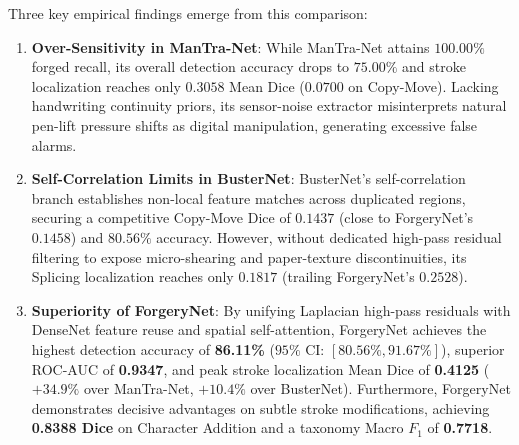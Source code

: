 \documentclass[pdflatex,sn-mathphys-num,iicol]{sn-jnl}
\begin{document}
Three key empirical findings emerge from this comparison:
\begin{enumerate}[1.]
    \item \textbf{Over-Sensitivity in ManTra-Net}: While ManTra-Net attains $100.00\%$ forged recall, its overall detection accuracy drops to $75.00\%$ and stroke localization reaches only $0.3058$ Mean Dice ($0.0700$ on Copy-Move). Lacking handwriting continuity priors, its sensor-noise extractor misinterprets natural pen-lift pressure shifts as digital manipulation, generating excessive false alarms.
    \item \textbf{Self-Correlation Limits in BusterNet}: BusterNet's self-correlation branch establishes non-local feature matches across duplicated regions, securing a competitive Copy-Move Dice of $0.1437$ (close to ForgeryNet's $0.1458$) and $80.56\%$ accuracy. However, without dedicated high-pass residual filtering to expose micro-shearing and paper-texture discontinuities, its Splicing localization reaches only $0.1817$ (trailing ForgeryNet's $0.2528$).
    \item \textbf{Superiority of ForgeryNet}: By unifying Laplacian high-pass residuals with DenseNet feature reuse and spatial self-attention, ForgeryNet achieves the highest detection accuracy of \textbf{86.11\%} ($95\%$ CI: $[80.56\%, 91.67\%]$), superior ROC-AUC of \textbf{0.9347}, and peak stroke localization Mean Dice of \textbf{0.4125} ($+34.9\%$ over ManTra-Net, $+10.4\%$ over BusterNet). Furthermore, ForgeryNet demonstrates decisive advantages on subtle stroke modifications, achieving \textbf{0.8388 Dice} on Character Addition and a taxonomy Macro $F_1$ of \textbf{0.7718}.
\end{enumerate}
\end{document}
